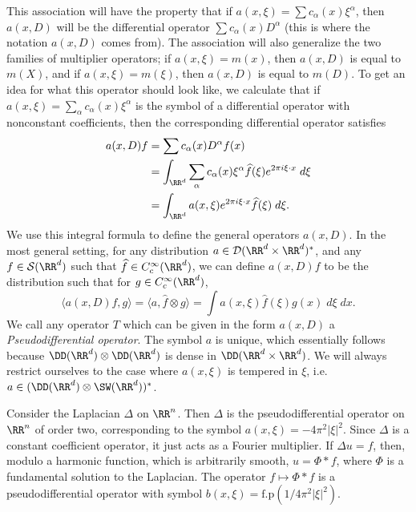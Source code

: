 This association will have the property that if $a(x,\xi) = \sum c_\alpha(x) \xi^\alpha$, then $a(x,D)$ will be the differential operator $\sum c_\alpha(x) D^\alpha$ (this is where the notation $a(x,D)$ comes from). The association will also generalize the two families of multiplier operators; if $a(x,\xi) = m(x)$, then $a(x,D)$ is equal to $m(X)$, and if $a(x,\xi) = m(\xi)$, then $a(x,D)$ is equal to $m(D)$. To get an idea for what this operator should look like, we calculate that if $a(x,\xi) = \sum_\alpha c_\alpha(x) \xi^\alpha$ is the symbol of a differential operator with nonconstant coefficients, then the corresponding differential operator satisfies
%
\begin{align*}
    a(x,D) f &= \sum c_\alpha(x) D^\alpha f(x)\\
    &= \int_{\RR^d} \sum_\alpha c_\alpha(x) \xi^\alpha \widehat{f}(\xi) e^{2 \pi i \xi \cdot x}\; d\xi\\
    &= \int_{\RR^d} a(x,\xi) e^{2 \pi i \xi \cdot x} \widehat{f}(\xi)\; d\xi.
\end{align*}
%
We use this integral formula to define the general operators $a(x,D)$. In the most general setting, for any distribution $a \in \mathcal{D}(\RR^d \times \RR^d)^*$, and any $f \in \mathcal{S}(\RR^d)$ such that $\widehat{f} \in C_c^\infty(\RR^d)$, we can define $a(x,D) f$ to be the distribution such that for $g \in C_c^\infty(\RR^d)$,
%
\[ \langle a(x,D) f, g \rangle = \langle a, \widehat{f} \otimes g \rangle = \int a(x,\xi) \widehat{f}(\xi) g(x)\; d\xi\; dx. \]
%
We call any operator $T$ which can be given in the form $a(x,D)$ a \emph{Pseudodifferential operator}. The symbol $a$ is unique, which essentially follows because $\DD(\RR^d) \otimes \DD(\RR^d)$ is dense in $\DD(\RR^d \times \RR^d)$. We will always restrict ourselves to the case where $a(x,\xi)$ is tempered in $\xi$, i.e. $a \in (\DD(\RR^d) \otimes \SW(\RR^d))^*$.

\begin{example}
    Consider the Laplacian $\Delta$ on $\RR^n$. Then $\Delta$ is the pseudodifferential operator on $\RR^n$ of order two, corresponding to the symbol $a(x,\xi) = - 4\pi^2 |\xi|^2$. Since $\Delta$ is a constant coefficient operator, it just acts as a Fourier multiplier. If $\Delta u = f$, then, modulo a harmonic function, which is arbitrarily smooth, $u = \Phi * f$, where $\Phi$ is a fundamental solution to the Laplacian. The operator $f \mapsto \Phi * f$ is a pseudodifferential operator with symbol $b(x,\xi) = \text{f.p}(1/4\pi^2 |\xi|^2)$. 
\end{example}

